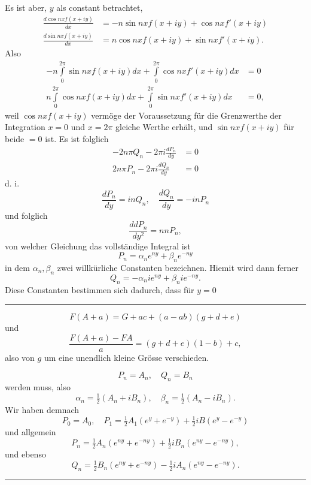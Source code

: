 \clearpage{}
\noindent\hspace*{\parindent}Es ist aber, \(y\) als constant betrachtet,
\[\begin{aligned}
\frac{d\cos nx f(x+iy)}{dx}&=-n\sin nx f(x+iy)+\cos nx f'(x+iy)\\
\frac{d\sin nx f(x+iy)}{dx}&=n\cos nx f(x+iy)+\sin nx f'(x+iy).
\end{aligned}\]
\noindent Also
\[\begin{aligned}
-n\int\limits_0^{2\pi}\sin nx f(x+iy)dx+\int\limits_0^{2\pi}\cos nx f'(x+iy)dx&=0\\
n\int\limits_0^{2\pi}\cos nx f(x+iy)dx+\int\limits_0^{2\pi}\sin nx f'(x+iy)dx&=0,
\end{aligned}\]
\noindent weil \(\cos nx f(x+iy)\) vermöge der Voraussetzung für die Grenzwerthe der Integration \(x=0\) und \(x=2\pi\) gleiche Werthe erhält, und \(\sin nx f(x+iy)\) für beide \(=0\) ist. Es ist folglich
\[\begin{aligned}
-2n\pi Q_n-2\pi i\frac{dP_n}{dy}&=0\\
2n\pi P_n-2\pi i\frac{dQ_n}{dy}&=0
\end{aligned}\]
\noindent d. i.
\[\frac{dP_n}{dy}=inQ_n,\quad\frac{dQ_n}{dy}=-inP_n\]
\noindent und folglich
\[\frac{ddP_n}{dy^2}=nnP_n,\]
\noindent von welcher Gleichung das vollständige Integral ist
\[P_n=\alpha_n e^{ny}+\beta_n e^{-ny}\]
\noindent in dem \(\alpha_n,\beta_n\) zwei willkürliche Constanten bezeichnen. Hiemit wird dann ferner
\[Q_n=-\alpha_n i e^{ny}+\beta_n i e^{-ny}.\]
\noindent Diese Constanten bestimmen sich dadurch, dass für \(y=0\)
\par\vfill\noindent\rule{.25\linewidth}{.4pt}\par\smallskip
{\footnotesize
\[F(A+a)=G+ac+(a-ab)(g+d+e)\]
\noindent und
\[\frac{F(A+a)-FA}{a}=(g+d+e)(1-b)+c,\]
\noindent also von \(g\) um eine unendlich kleine Grösse verschieden.\par}
\clearpage{}
\[P_n=A_n,\quad Q_n=B_n\]
\noindent werden muss, also
\[\alpha_n=\tfrac12(A_n+iB_n),\quad\beta_n=\tfrac12(A_n-iB_n).\]
\noindent Wir haben demnach
\[P_0=A_0,\quad P_1=\tfrac12 A_1(e^y+e^{-y})+\tfrac12 iB(e^y-e^{-y})\]
\noindent und allgemein
\[P_n=\tfrac12 A_n(e^{ny}+e^{-ny})+\tfrac12 iB_n(e^{ny}-e^{-ny}),\]
\noindent und ebenso
\[Q_n=\tfrac12 B_n(e^{ny}+e^{-ny})-\tfrac12 iA_n(e^{ny}-e^{-ny}).\]
\begin{center}\vspace{3em}\rule{.24\linewidth}{.4pt}\end{center}
